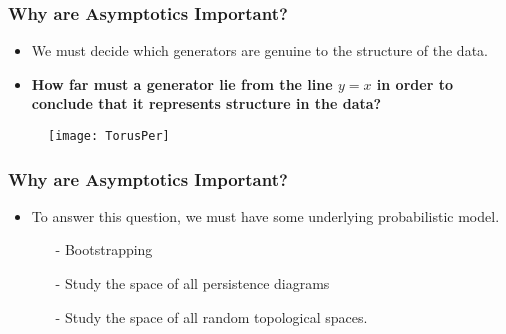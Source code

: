 \begin{frame}
\frametitle{Why are Asymptotics Important?}
\begin{itemize}
\item<1-> We must decide which generators are genuine to the structure of the data.
\item<2-> \textbf{How far must a generator lie from the line $y=x$ in order to conclude that it represents structure in the data?}
\end{itemize}
\begin{figure}
\begin{center}
	\texttt{[image: TorusPer]}
\end{center}
\end{figure}
\end{frame}

\begin{frame}
\frametitle{Why are Asymptotics Important?}
\begin{itemize}
\item To answer this question, we must have some underlying probabilistic model.
	\begin{itemize}
	\item[-] Bootstrapping
	\item[-] Study the space of all persistence diagrams
	\item[-] Study the space of all random topological spaces.
	\end{itemize}
\end{itemize}
\end{frame}